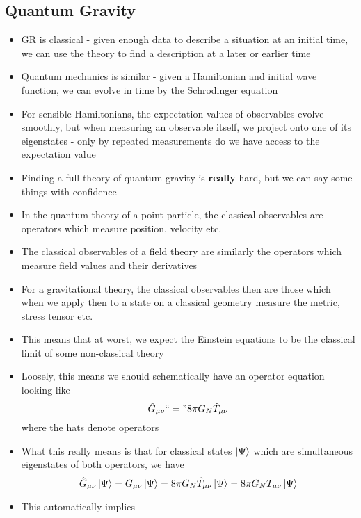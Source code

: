 \documentclass[12pt,a4paper]{article}
\numberwithin{equation}{section}
\begin{document}
	\subsection{Quantum Gravity}
	\begin{itemize}
		\item GR is classical - given enough data to describe a situation at an initial time, we can use the theory to find a description at a later or earlier time
		\item Quantum mechanics is similar - given a Hamiltonian and initial wave function, we can evolve in time by the Schrodinger equation
		\item For sensible Hamiltonians, the expectation values of observables evolve smoothly, but when measuring an observable itself, we project onto one of its eigenstates - only by repeated measurements do we have access to the expectation value
		\item Finding a full theory of quantum gravity is \textbf{really} hard, but we can say some things with confidence
		\item In the quantum theory of a point particle, the classical observables are operators which measure position, velocity etc.
		\item The classical observables of a field theory are similarly the operators which measure field values and their derivatives
		\item For a gravitational theory, the classical observables then are those which when we apply then to a state on a classical geometry measure the metric, stress tensor etc.
		\item This means that at worst, we expect the Einstein equations to be the classical limit of some non-classical theory
		\item Loosely, this means we should schematically have an operator equation looking like
		\begin{equation}
			\hat{G}_{\mu\nu}``="8\pi G_{N}\hat{T}_{\mu\nu}
		\end{equation}
		where the hats denote operators
		\item What this really means is that for classical states $\ket{\Psi}$ which are simultaneous eigenstates of both operators, we have
		\begin{equation}
			\hat{G}_{\mu\nu}\ket{\Psi}=G_{\mu\nu}\ket{\Psi}=8\pi G_{N}\hat{T}_{\mu\nu}\ket{\Psi}=8\pi G_{N}T_{\mu\nu}\ket{\Psi}
		\end{equation}
		\item This automatically implies
		\begin{equation}

\end{equation}
\end{itemize}
\end{document}
